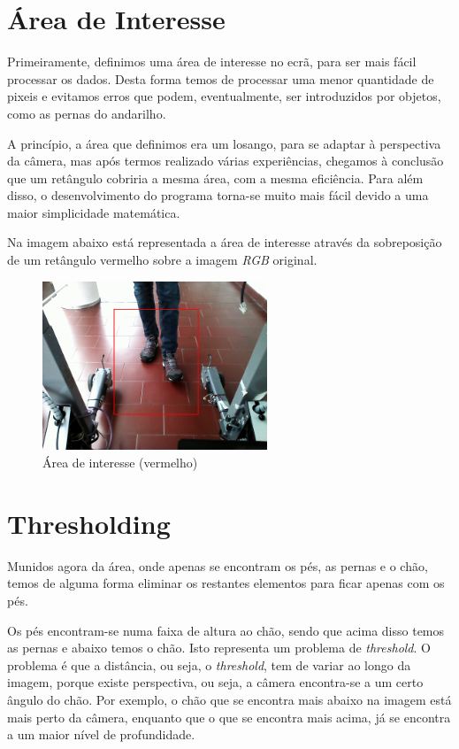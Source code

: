 \documentclass[a4paper]{report}
\begin{document}
\section{Área de Interesse}
Primeiramente, definimos uma área de interesse no ecrã, para ser mais fácil processar
os dados. Desta forma temos de processar uma menor quantidade de pixeis e evitamos
erros que podem, eventualmente, ser introduzidos por objetos, como as pernas do
andarilho.

A princípio, a área que definimos era um losango, para se adaptar à perspectiva da
câmera, mas após termos realizado várias experiências, chegamos à conclusão que um
retângulo cobriria a mesma área, com a mesma eficiência. Para além disso, o
desenvolvimento do programa torna-se muito mais fácil devido a uma maior
simplicidade matemática.

Na imagem abaixo está representada a área de interesse através da sobreposição
de um retângulo vermelho sobre a imagem \textit{RGB} original.

\begin{figure}[H]
    \centering
        \includegraphics[width=0.6\textwidth]{images/building/area_of_interest.png}
        \caption{Área de interesse (vermelho)}
\end{figure}


\vspace{1cm}

\section{Thresholding}
Munidos agora da área, onde apenas se encontram os pés, as pernas e o
chão, temos de alguma forma eliminar os restantes elementos para ficar apenas com
os pés.

Os pés encontram-se numa faixa de altura ao chão, sendo que acima disso temos as
pernas e abaixo temos o chão. Isto representa um problema de \textit{threshold}.
O problema é que a distância, ou seja, o \textit{threshold}, tem de variar ao longo da imagem,
porque existe perspectiva, ou seja, a câmera encontra-se a um certo ângulo do chão. Por exemplo,
o chão que se encontra mais abaixo na imagem está mais perto da câmera, enquanto que o que se
encontra mais acima, já se encontra a um maior nível de profundidade.
\end{document}

